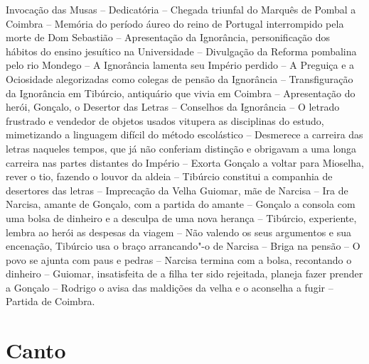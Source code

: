 {\footnotesize\noindent Invocação das Musas -- Dedicatória -- Chegada triunfal do	\index{\Dedic} \index{\Invoc}
Marquês de Pombal a Coimbra -- Memória do período áureo do reino de Portugal		\index{\Marqpombal}
interrompido pela morte de Dom Sebastião -- 
Apresentação da Ignorância, personificação dos		
hábitos do ensino jesuítico na Universidade -- Divulgação da Reforma pombalina pelo rio Mondego --		\index{\Monde}
A Ignorância lamenta seu Império perdido -- A 		
Preguiça e a Ociosidade alegorizadas como colegas
de pensão da Ignorância -- Transfiguração 			
da Ignorância em Tibúrcio, antiquário que vivia em
Coimbra -- Apresentação do herói, Gonçalo, o Desertor das Letras -- Conselhos da
Ignorância -- O letrado frustrado e vendedor de objetos usados vitupera as disciplinas
do estudo, mimetizando a linguagem difícil do método escolástico
-- Desmerece a carreira das letras naqueles
tempos, que já não conferiam distinção e obrigavam a uma longa carreira nas partes
distantes do Império -- Exorta Gonçalo a voltar para Mioselha, rever o tio, fazendo o louvor da
aldeia -- Tibúrcio constitui a companhia de desertores das letras -- Imprecação da Velha
Guiomar, mãe de Narcisa -- Ira de Narcisa, amante de Gonçalo, com a partida
do amante -- Gonçalo a consola com uma bolsa de dinheiro e a desculpa de uma nova herança
-- Tibúrcio, experiente, lembra ao herói as 
despesas da viagem -- Não valendo os seus argumentos e sua encenação, Tibúrcio
usa o braço arrancando"-o de Narcisa -- Briga na pensão -- O povo se ajunta
com paus e pedras -- Narcisa termina com a bolsa, recontando o dinheiro -- Guiomar,
insatisfeita de a filha ter sido rejeitada, planeja fazer prender a Gonçalo -- Rodrigo
o avisa das maldições da velha e o aconselha a fugir -- Partida de Coimbra.}

\chapter{Canto } 

